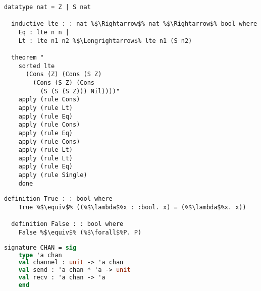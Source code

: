 \documentclass{article}
\begin{document}
\begin{lstlisting}[style=codestyle1, escapechar=\%]
  datatype nat = Z | S nat 

  inductive lte : : nat %$\Rightarrow$% nat %$\Rightarrow$% bool where
    Eq : lte n n |
    Lt : lte n1 n2 %$\Longrightarrow$% lte n1 (S n2)

  theorem "
    sorted lte
      (Cons (Z) (Cons (S Z)
        (Cons (S Z) (Cons
          (S (S (S Z))) Nil))))"
    apply (rule Cons)
    apply (rule Lt)
    apply (rule Eq)
    apply (rule Cons)
    apply (rule Eq)
    apply (rule Cons)
    apply (rule Lt)
    apply (rule Lt)
    apply (rule Eq)
    apply (rule Single)
    done
  \end{lstlisting}

\begin{lstlisting}[style=codestyle1, escapechar=\%]
  definition True : : bool where 
    True %$\equiv$% ((%$\lambda$%x : :bool. x) = (%$\lambda$%x. x))

  definition False : : bool where 
    False %$\equiv$% (%$\forall$%P. P)

  \end{lstlisting}

\begin{lstlisting}[language=ML, style=codestyle1]
  signature CHAN = sig
    type 'a chan 
    val channel : unit -> 'a chan
    val send : 'a chan * 'a -> unit
    val recv : 'a chan -> 'a
    end     
\end{lstlisting}
\end{document}
